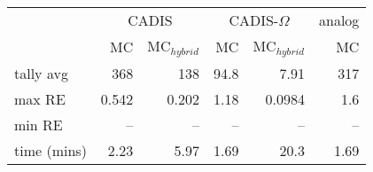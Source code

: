 \begin{tabular}{lrrrrr}
\toprule
{} & \multicolumn{2}{c}{CADIS}   & \multicolumn{2}{c}{CADIS-$\Omega$}  & analog \\
{} &    MC & MC$_{hybrid}$ &         MC & MC$_{hybrid}$ &     MC \\
\midrule
tally avg   &   368 &         138 &       94.8 &        7.91 &    317 \\
max RE      & 0.542 &       0.202 &       1.18 &      0.0984 &    1.6 \\
min RE      &   -- &         -- &        -- &         -- &    -- \\
time (mins) &  2.23 &        5.97 &       1.69 &        20.3 &   1.69 \\
\bottomrule
\end{tabular}
